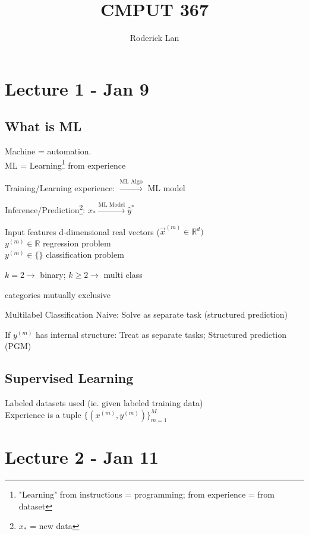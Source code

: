 \documentclass{article}
\title{CMPUT 367}
\author{Roderick Lan}
\date{}
\begin{document}
\maketitle

\tableofcontents
\break

\section{Lecture 1 - Jan 9}
\subsection{What is ML}
  Machine = automation.\\
  ML = Learning\footnote[1]{"Learning" from instructions = programming; from experience = from dataset} from experience
  \begin{list}{}{spacing}
    \item Training/Learning experience: $\xrightarrow{\text{ML Algo}}$ ML model
    \item Inference/Prediction\footnote[2]{$x_*$ = new data}: $x_* \xrightarrow{\text{ML Model}}\hat y ^*$
  \end{list}
  Input features d-dimensional real vectors ($\vec x^{(m)} \in \mathbb R^d)$\\
  $y^{(m)} \in \mathbb R$ regression problem
  \\
  $y^{(m)} \in \{\}$ classification problem
  \begin{list}{}{spacing}
    \item $k=2 \rightarrow$ binary; $k\ge 2\rightarrow$ multi class
    \item categories mutually exclusive
  \end{list}
  \begin{expln}{Multilabel Classification}{}
    Naive: Solve as separate task (structured prediction)
  \end{expln}
  If $y^{(m)}$ has internal structure: Treat as separate tasks; Structured prediction (PGM)
  \break
  \subsection{Supervised Learning}
  Labeled datasets used (ie. given labeled training data)\\
  Experience is a tuple $\{(x^{(m)}, y^{(m)})\}_{m=1}^M$





\section{Lecture 2 - Jan 11}
\end{document}
